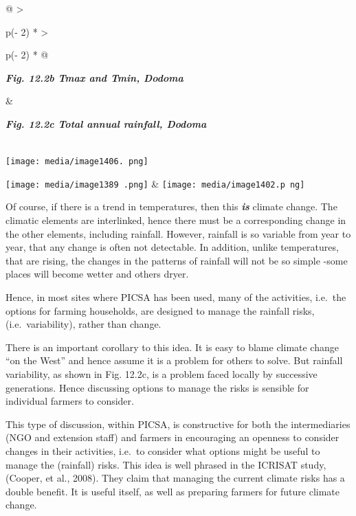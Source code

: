 \documentclass[
  letterpaper,
  DIV=11,
  numbers=noendperiod]{scrreprt}
\begin{document}
\begin{longtable}[]{@{}
  >{\raggedright\arraybackslash}p{(\columnwidth - 2\tabcolsep) * }
  >{\raggedright\arraybackslash}p{(\columnwidth - 2\tabcolsep) * }@{}}
\toprule\noalign{}
\begin{minipage}[b]{\linewidth}\raggedright
\textbf{\emph{Fig. 12.2b Tmax and Tmin, Dodoma}}
\end{minipage} & \begin{minipage}[b]{\linewidth}\raggedright
\textbf{\emph{Fig. 12.2c Total annual rainfall, Dodoma}}
\end{minipage} \\
\midrule\noalign{}
\endhead
\bottomrule\noalign{}
\endlastfoot
\texttt{[image: media/image1406. png]}

\texttt{[image: media/image1389 .png]}
&
\texttt{[image: media/image1402.p ng]} \\
\end{longtable}

Of course, if there is a trend in temperatures, then this
\textbf{\emph{is}} climate change. The climatic elements are
interlinked, hence there must be a corresponding change in the other
elements, including rainfall. However, rainfall is so variable from year
to year, that any change is often not detectable. In addition, unlike
temperatures, that are rising, the changes in the patterns of rainfall
will not be so simple -some places will become wetter and others dryer.

Hence, in most sites where PICSA has been used, many of the activities,
i.e.~the options for farming households, are designed to manage the
rainfall risks, (i.e.~variability), rather than change.

There is an important corollary to this idea. It is easy to blame
climate change ``on the West'' and hence assume it is a problem for
others to solve. But rainfall variability, as shown in Fig. 12.2c, is a
problem faced locally by successive generations. Hence discussing
options to manage the risks is sensible for individual farmers to
consider.

This type of discussion, within PICSA, is constructive for both the
intermediaries (NGO and extension staff) and farmers in encouraging an
openness to consider changes in their activities, i.e.~to consider what
options might be useful to manage the (rainfall) risks. This idea is
well phrased in the ICRISAT study, (Cooper, et al., 2008). They claim
that managing the current climate risks has a double benefit. It is
useful itself, as well as preparing farmers for future climate change.
\end{document}
